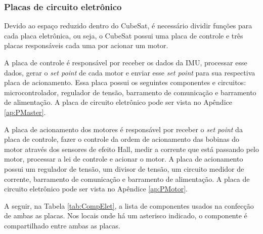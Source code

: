 \documentclass[
	12pt,				%
	openany,			%
	twoside,			%
	a4paper,			%
	english,			%
	french,				%
	spanish,			%
	brazil,				%
	oldfontcommands
	]{abntex2}
\begin{document}
\subsubsection{Placas de circuito eletrônico}

Devido ao espaço reduzido dentro do CubeSat, é necessário dividir funções para cada placa eletrônica, ou seja, o CubeSat possui uma placa de controle e três placas responsáveis cada uma por acionar um motor.


A placa de controle é responsável por receber os dados da IMU, processar esse dados, gerar o \textit{set point} de cada motor e enviar esse \textit{set point} para sua respectiva placa de acionamento. Essa placa possui os seguintes componentes e circuitos: microcontrolador, regulador de tensão, barramento de comunicação e barramento de alimentação. A placa de circuito eletrônico pode ser vista no Apêndice \ref{ap:PMaster}. 


A placa de acionamento dos motores é responsável por receber o \textit{set point} da placa de controle, fazer o controle da ordem de acionamento das bobinas do motor através dos sensores de efeito Hall, medir a corrente que está passando pelo motor, processar a lei de controle e acionar o motor. A placa de acionamento possui um regulador de tensão, um divisor de tensão, um circuito medidor de corrente, barramento de comunicação e barramento de alimentação.  A placa de circuito eletrônico pode ser vista no Apêndice \ref{ap:PMotor}.


A seguir, na Tabela \ref{tab:CompElet}, a lista de componentes usados na confecção de ambas as placas. Nos locais onde há um asterisco indicado, o componente é compartilhado entre ambas as placas.
\end{document}

